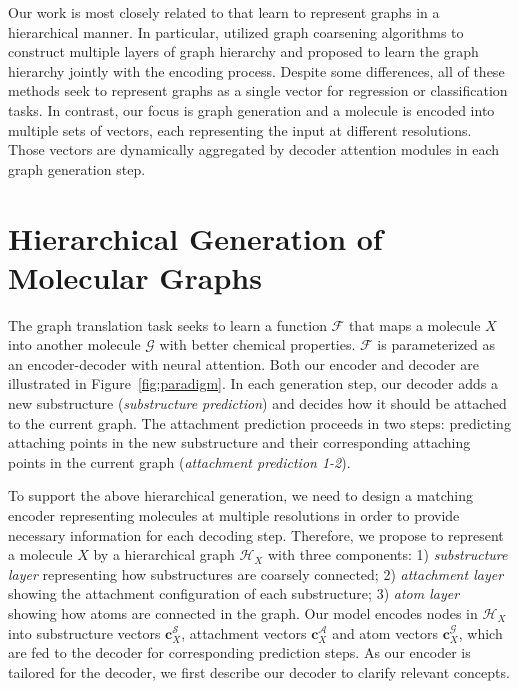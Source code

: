 \documentclass{article} \usepackage{iclr2020_conference,times}
\newcommand{\graph}{\mathcal{G}}
\def\vc{{\bm{c}}}
\def\gA{{\mathcal{A}}}
\def\gF{{\mathcal{F}}}
\def\gH{{\mathcal{H}}}
\def\gS{{\mathcal{S}}}
\begin{document}
Our work is most closely related to \citep{defferrard2016convolutional,ying2018hierarchical,gao2019graph} that learn to represent graphs in a hierarchical manner. In particular, \citet{defferrard2016convolutional} utilized graph coarsening algorithms to construct multiple layers of graph hierarchy and
\citet{ying2018hierarchical,gao2019graph} proposed to learn the graph hierarchy jointly with the encoding process.
Despite some differences, all of these methods seek to represent graphs as a single vector for regression or classification tasks. In contrast, our focus is graph generation and a molecule is encoded into multiple sets of vectors, each representing the input at different resolutions. Those vectors are dynamically aggregated by decoder attention modules in each graph generation step.
%
 \section{Hierarchical Generation of Molecular Graphs}

The graph translation task seeks to learn a function $\gF$ that maps a molecule $X$ into another molecule $\graph$ with better chemical properties. $\gF$ is parameterized as an encoder-decoder with neural attention.
Both our encoder and decoder are illustrated in Figure~\ref{fig:paradigm}.
In each generation step, our decoder adds a new substructure (\emph{substructure prediction}) and decides how it should be attached to the current graph. The attachment prediction proceeds in two steps: predicting attaching points in the new substructure and their corresponding attaching points in the current graph (\emph{attachment prediction 1-2}). 

To support the above hierarchical generation, we need to design a matching encoder representing molecules at multiple resolutions in order to provide necessary information for each decoding step. 
Therefore, we propose to represent a molecule $X$ by a hierarchical graph $\gH_X$ with three components: 1) \emph{substructure layer} representing how substructures are coarsely connected; 2) \emph{attachment layer} showing the attachment configuration of each substructure; 3) \emph{atom layer} showing how atoms are connected in the graph. Our model encodes nodes in $\gH_X$ into substructure vectors $\vc_X^\gS$, attachment vectors $\vc_X^\gA$ and atom vectors $\vc_X^\graph$, which are fed to the decoder for corresponding prediction steps.
As our encoder is tailored for the decoder, we first describe our decoder to clarify relevant concepts.
\end{document}
